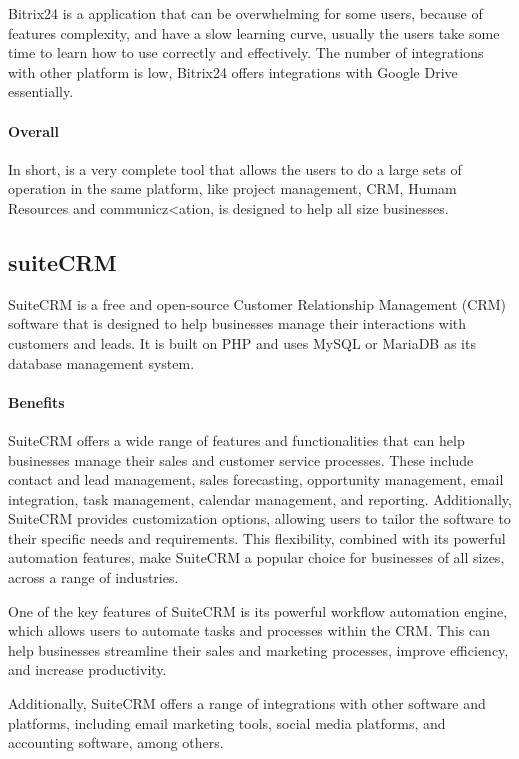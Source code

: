 \documentclass{article}
\begin{document}
Bitrix24 is a application that can be overwhelming for some users, because of features complexity, and have a slow learning curve, usually the users take some time to learn how to use correctly and effectively.
The number of integrations with other platform is low, Bitrix24 offers integrations with Google Drive essentially.

\paragraph{Overall}

In short, is a very complete tool that allows the users to do a large sets of operation in the same platform, like project management, CRM, Humam Resources and communicz<ation, is designed to help all size businesses.

\subsection{suiteCRM}

SuiteCRM is a free and open-source Customer Relationship Management (CRM) software that is designed to help businesses manage their interactions with customers and leads. It is built on PHP and uses MySQL or MariaDB as its database management system.

\paragraph{Benefits}

SuiteCRM offers a wide range of features and functionalities that can help businesses manage their sales and customer service processes. These include contact and lead management, sales forecasting, opportunity management, email integration, task management, calendar management, and reporting. Additionally, SuiteCRM provides customization options, allowing users to tailor the software to their specific needs and requirements. This flexibility, combined with its powerful automation features, make SuiteCRM a popular choice for businesses of all sizes, across a range of industries.

One of the key features of SuiteCRM is its powerful workflow automation engine, which allows users to automate tasks and processes within the CRM. This can help businesses streamline their sales and marketing processes, improve efficiency, and increase productivity.

Additionally, SuiteCRM offers a range of integrations with other software and platforms, including email marketing tools, social media platforms, and accounting software, among others. 
\end{document}
